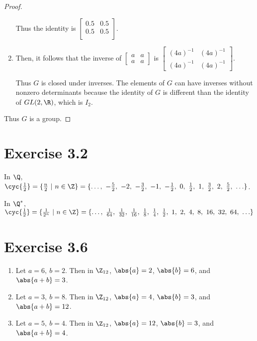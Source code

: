 \documentclass{article}
\begin{document}
\begin{proof}
\begin{enumerate}[label=(\roman*)]
            Thus the identity is \(\begin{bmatrix}
                0.5 & 0.5 \\
                0.5 & 0.5 \\
            \end{bmatrix}\).
        \item Then, it follows that the inverse of \(\begin{bmatrix}
            a & a \\
            a & a
        \end{bmatrix}\) is \(\begin{bmatrix}
            (4a)^{-1} & (4a)^{-1} \\
            (4a)^{-1} & (4a)^{-1}
        \end{bmatrix}\).

        Thus \(G\) is closed under inverses. The elements of \(G\) can have inverses without nonzero determinants because the identity of \(G\) is different than the identity of \(GL(2, \R)\), which is \(I_2\).
    \end{enumerate}

    Thus \(G\) is a group.
\end{proof}

\section*{Exercise 3.2}
In \(\Q\), \(\cyc{\frac{1}{2}} = \{\frac{n}{2}\ \vert\ n\in\Z\} = \{\ldots,\ -\frac{5}{2},\ -2,\ -\frac{3}{2},\ -1,\ -\frac{1}{2},\ 0,\ \frac{1}{2},\ 1,\ \frac{3}{2},\ 2,\ \frac{5}{2},\ \ldots\}\).

In \(\Q^*\), \(\cyc{\frac{1}{2}} = \{\frac{1}{2^n}\ \vert\ n\in\Z\} = \{\ldots,\ \frac{1}{64},\ \frac{1}{32},\ \frac{1}{16},\ \frac{1}{8},\ \frac{1}{4},\ \frac{1}{2},\ 1,\ 2,\ 4,\ 8,\ 16,\ 32,\ 64,\ \ldots\}\)

\section*{Exercise 3.6}
\begin{enumerate}[label=\alph*)]
    \item Let \(a=6,\ b=2\). Then in \(\Z_{12}\), \(\abs{a}=2\), \(\abs{b}=6\), and \(\abs{a+b}=3\).
    \item Let \(a=3,\ b=8\). Then in \(\Z_{12}\), \(\abs{a}=4\), \(\abs{b}=3\), and \(\abs{a+b}=12\).
    \item Let \(a=5,\ b=4\). Then in \(\Z_{12}\), \(\abs{a}=12\), \(\abs{b}=3\), and \(\abs{a+b}=4\).
\end{enumerate}
\end{document}
